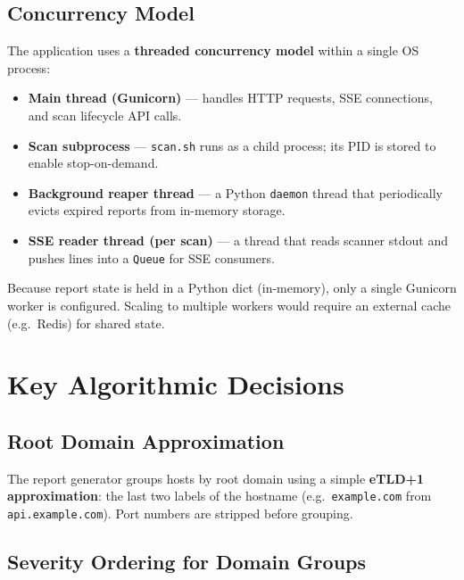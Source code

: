 \subsection{Concurrency Model}

The application uses a \textbf{threaded concurrency model} within a single OS process:

\begin{itemize}[noitemsep]
  \item \textbf{Main thread (Gunicorn)} — handles HTTP requests, SSE connections,
        and scan lifecycle API calls.
  \item \textbf{Scan subprocess} — \texttt{scan.sh} runs as a child process;
        its PID is stored to enable stop-on-demand.
  \item \textbf{Background reaper thread} — a Python \texttt{daemon} thread that
        periodically evicts expired reports from in-memory storage.
  \item \textbf{SSE reader thread (per scan)} — a thread that reads scanner
        stdout and pushes lines into a \texttt{Queue} for SSE consumers.
\end{itemize}

\begin{notebox}
  Because report state is held in a Python dict (in-memory), only a single
  Gunicorn worker is configured. Scaling to multiple workers would require
  an external cache (e.g.\ Redis) for shared state.
\end{notebox}

\section{Key Algorithmic Decisions}
\label{sec:algo_decisions}

\subsection{Root Domain Approximation}

The report generator groups hosts by root domain using a simple
\textbf{eTLD+1 approximation}: the last two labels of the hostname
(e.g.\ \texttt{example.com} from \texttt{api.example.com}). Port numbers
are stripped before grouping.

\subsection{Severity Ordering for Domain Groups}

